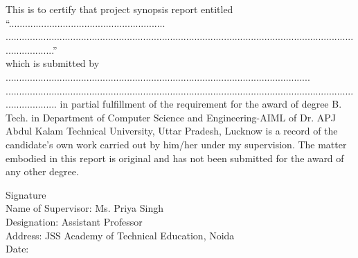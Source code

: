 \doublespacing
This is to certify that project synopsis report entitled “..........................................................\\...................................................................................................................................................”\\which
is submitted by ................................................................................................................. 
\\.................................................................................................................................................... 
in partial fulfillment of the requirement for the award of degree B. Tech. in Department of Computer Science and Engineering-AIML of Dr. APJ Abdul Kalam Technical University, Uttar Pradesh, Lucknow is a record of the candidate’s own work carried out by him/her under my supervision. The matter embodied in this report is original and has not been submitted for the award of any other degree.

\vspace{15 mm}

\begin{flushleft}

Signature\\
\vspace{10 mm}
Name of Supervisor: Ms. Priya Singh\\
Designation: Assistant Professor\\
Address: JSS Academy of Technical Education, Noida\\
\vspace{10mm}
Date:
\end{flushleft}
\restoregeometry
\newpage

\newpage
\begin{abstractpage}

\end{abstractpage}
\restoregeometry

